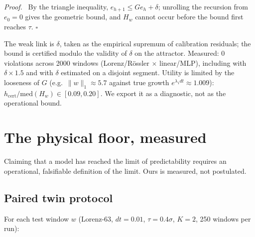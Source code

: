 \documentclass[aps,pre,twocolumn,superscriptaddress,nofootinbib,longbibliography]{revtex4-2}
\newenvironment{myproof}{\par\noindent\textit{Proof.}\ }{\hfill$\square$\par\medskip}
\newcommand{\Hw}{H_w}
\begin{document}
\begin{myproof}
By the triangle inequality, $e_{h+1} \le G e_h + \delta$; unrolling the
recursion from $e_0 = 0$ gives the geometric bound, and $\Hw$ cannot
occur before the bound first reaches $\tau$.
\end{myproof}

The weak link is $\delta$, taken as the empirical supremum of calibration
residuals; the bound is certified modulo the validity of $\delta$ on the
attractor. Measured: 0 violations across 2000 windows (Lorenz/R\"ossler
$\times$ linear/MLP), including with $\delta \times 1.5$ and with
$\delta$ estimated on a disjoint segment. Utility is limited by the
looseness of $G$ (e.g.\ $\|w\|_1 \approx 5.7$ against true growth
$e^{\lambda_1 dt} \approx 1.009$):
$h_{\mathrm{cert}}/\mathrm{med}(\Hw) \in [0.09, 0.20]$. We export it as a
diagnostic, not as the operational bound.

\section{The physical floor, measured}
\label{sec:floor}

Claiming that a model has reached the limit of predictability requires an
operational, falsifiable definition of the limit. Ours is measured, not
postulated.

\subsection{Paired twin protocol}
\label{sec:twins}

For each test window $w$ (Lorenz-63, $dt = 0.01$, $\tau = 0.4\sigma$,
$K = 2$, 250 windows per run):
\end{document}
